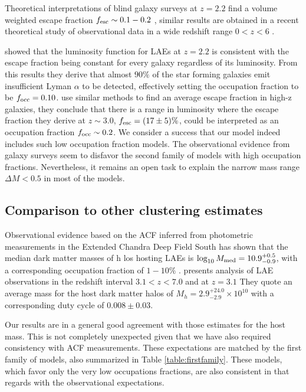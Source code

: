 \documentclass[usenatbib]{mn2e}
\newcommand{\ly}{{\ifmmode{{\rm Ly}\alpha}\else{Ly$\alpha$~}\fi}}
\newcommand{\hMsun}{{\ifmmode{h^{-1}{\rm
        {M_{\odot}}}}\else{$h^{-1}{\rm{M_{\odot}}}$}\fi}}
\newcommand{\Msun}{{\ifmmode{{\rm {M_{\odot}}}}\else{${\rm{M_{\odot}}}$}\fi}}
\begin{document}
{Theoretical interpretations of blind galaxy surveys at $z=2.2$ find a
volume weighted escape fraction $f_{\rm esc}\sim 0.1-0.2$
\cite{Hayes2010}, similar results are obtained in a recent theoretical
study of observational data in a wide redshift range $0<z<6$
\citep{Dijkstra2013}. 


\cite{Hayes2010} showed that the luminosity function for
LAEs at $z=2.2$ is consistent with the escape fraction being constant
for every galaxy regardless of its luminosity. From this results they
derive that almost $90\%$ of the star forming galaxies emit insufficient
Lyman $\alpha$ to be detected, effectively setting the occupation
fraction to be $f_{\rm occ}=0.10$. \cite{Dijkstra2013} use similar
methods to find an average \ly escape fraction in high-z galaxies,
they conclude that there is a range in \ly luminosity where the escape
fraction they derive at $z\sim 3.0$, $f_{\rm esc}=(17\pm 5)\%$, could
be interpreted as an occupation fraction $f_{\rm occ}\sim 0.2$. We
consider a success that our model indeed includes such low occupation
fraction models. The observational evidence from galaxy surveys seem
to disfavor the second family of models with high occupation
fractions. Nevertheless, it remains an open task to explain the narrow
mass range $\Delta M<0.5$ in most of the models. 


\subsection{Comparison to other clustering estimates}

Observational evidence based on the ACF inferred from photometric
measurements in the Extended Chandra Deep Field South has shown that
the median dark matter masses of h los hosting LAEs is
$\log_{10}M_{\rm  med}=10.9^{+0.5}_{-0.9}$\Msun, with a corresponding
occupation fraction of $1-10\%$  \citep{Gawiser07}.  \cite{Ouchi2010}
presents analysis of LAE observations in the redshift interval
$3.1<z<7.0$ and at $z=3.1$ They quote an average mass for the host
dark matter halos of $M_{h}=2.9^{+24.0}_{-2.9}\times 10^{10}$ \hMsun
with a corresponding duty cycle of $0.008\pm 0.03$.  

Our results are in a general good agreement with those estimates for
the host mass. This is not completely unexpected given that we have
also required consistency with ACF measurements. These expectations
are matched by the first family of models, also summarized in Table
\ref{table:firstfamily}. These models, which favor only the very
low occupations fractions, are also consistent in that regards with
the observational expectations.

}
\end{document}
